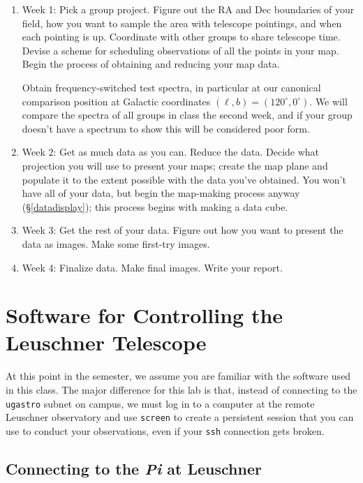 \documentclass[psfig,preprint]{aastex}
\begin{document}
\begin{enumerate}

\item Week 1: Pick a group project. Figure out the RA and
  Dec boundaries of your field, how you want to sample the area
  with telescope pointings, and when each pointing is up.
  Coordinate with other groups to share telescope time.
Devise a scheme for scheduling observations of all the points in your
map.  Begin the process of obtaining and reducing your map data. 

Obtain frequency-switched test spectra, in
particular at our canonical comparison position at Galactic coordinates
$(\ell, b) = (120^\circ, 0^\circ)$.  We will compare the spectra of all
groups in class the second week, and if your group doesn't have a
spectrum to show this will be considered poor form.

\item Week 2: Get as much data as you can. Reduce the data.  Decide what
  projection you will use to present your maps; create the map plane and
  populate it to the extent possible with the data you've obtained.  You
  won't have all of your data, but begin the map-making process anyway
  (\S \ref{datadisplay}); this process begins with making a data cube.

\item Week 3: Get the rest of your data. Figure out
  how you want to present the data as images. Make some first-try
  images. 

\item Week 4: Finalize data. Make final images. Write your report.

\end{enumerate}

\section{Software for Controlling the Leuschner Telescope}

\noindent
At this point in the semester, we assume you are familiar with
the software used in this class. The major difference
for this lab is that, instead of connecting to the {\tt ugastro}
subnet on campus, we must log in to a computer at the remote 
Leuschner observatory and use \texttt{screen} to create a persistent
session that you can use to conduct your observations, even
if your {\tt ssh} connection gets broken.

\subsection {Connecting to the {\it Pi} at Leuschner}
\end{document}
